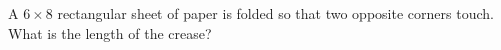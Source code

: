 A $6\times8$ rectangular sheet of paper is folded so that two opposite corners touch. What is the length of the crease?
